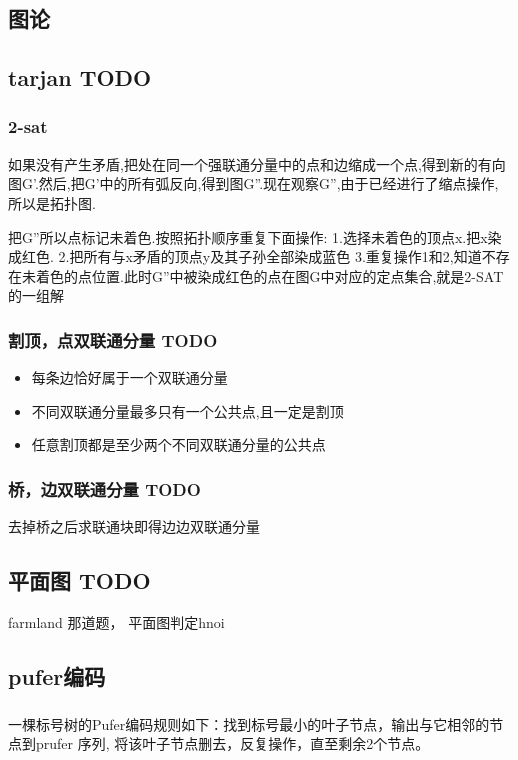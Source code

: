 \documentclass[landscape]{report}
\newcommand{\includecode}[2][c]{}
\begin{document}
\begin{flushleft}
\begin{multicols}{2}
\includecode[c++]{cash.cpp}
\chapter{ 图论}
\section{ tarjan  TODO}
\subsection{ 2-sat}
如果没有产生矛盾,把处在同一个强联通分量中的点和边缩成一个点,得到新的有向图G'.然后,把G'中的所有弧反向,得到图G''.现在观察G'',由于已经进行了缩点操作,所以是拓扑图.

把G''所以点标记未着色.按照拓扑顺序重复下面操作:
1.选择未着色的顶点x.把x染成红色.
2.把所有与x矛盾的顶点y及其子孙全部染成蓝色
3.重复操作1和2,知道不存在未着色的点位置.此时G''中被染成红色的点在图G中对应的定点集合,就是2-SAT的一组解

\includecode[c++]{cf568C.cpp}
\subsection{ 割顶，点双联通分量 TODO}
\begin{itemize}
\item 每条边恰好属于一个双联通分量
\item 不同双联通分量最多只有一个公共点,且一定是割顶
\item 任意割顶都是至少两个不同双联通分量的公共点
\end{itemize}
\subsection{ 桥，边双联通分量 TODO}
去掉桥之后求联通块即得边边双联通分量


\section{ 平面图 TODO}
farmland 那道题， 平面图判定hnoi
\section{pufer编码}
\paragraph{}
 一棵标号树的Pufer编码规则如下：找到标号最小的叶子节点，输出与它相邻的节点到prufer 序列, 
将该叶子节点删去，反复操作，直至剩余2个节点。

\end{multicols}
\end{flushleft}
\end{document}
